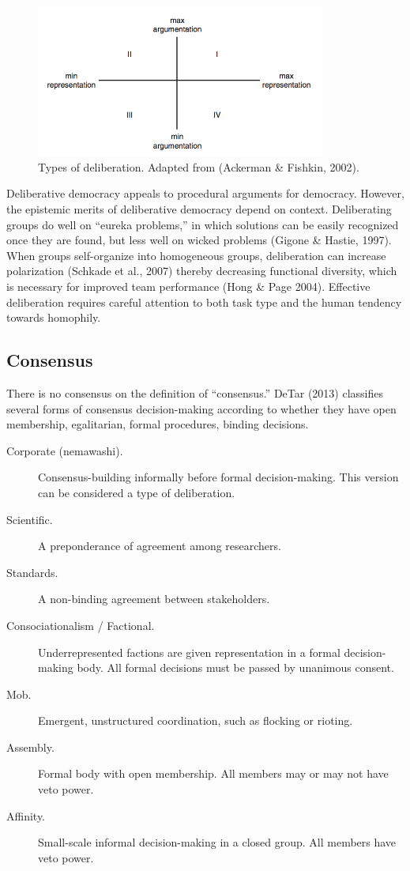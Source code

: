 \begin{figure}
\centering
\includegraphics[width=3.75in]{images/fig-deliberation.png}
\caption{Types of deliberation. Adapted from (Ackerman \& Fishkin, 2002).\label{fig:deliberation}}
\end{figure}

Deliberative democracy appeals to procedural arguments for democracy. However, the epistemic merits of deliberative democracy depend on context. Deliberating groups do well on ``eureka problems,'' in which solutions can be easily recognized once they are found, but less well on wicked problems (Gigone \& Hastie, 1997). When groups self-organize into homogeneous groups, deliberation can increase polarization (Schkade et al., 2007) thereby decreasing functional diversity, which is necessary for improved team performance (Hong \& Page 2004). Effective deliberation requires careful attention to both task type and the human tendency towards homophily.

\subsection{Consensus}
There is no consensus on the definition of ``consensus.''
DeTar (2013) classifies several forms of consensus decision-making according to whether they have open membership, egalitarian, formal procedures, binding decisions.

\begin{description}
\item[Corporate (nemawashi).]{Consensus-building informally before formal decision-making. This version can be considered a type of deliberation.}
\item[Scientific.]{A preponderance of agreement among researchers.}
\item[Standards.]{A non-binding agreement between stakeholders.}
\item[Consociationalism / Factional.]{Underrepresented factions are given representation in a formal decision-making body. All formal decisions must be passed by unanimous consent.}
\item[Mob.]{Emergent, unstructured coordination, such as flocking or rioting.}
\item[Assembly.]{Formal body with open membership. All members may or may not have veto power.}
\item[Affinity.]{Small-scale informal decision-making in a closed group. All members have veto power.}
\end{description}

